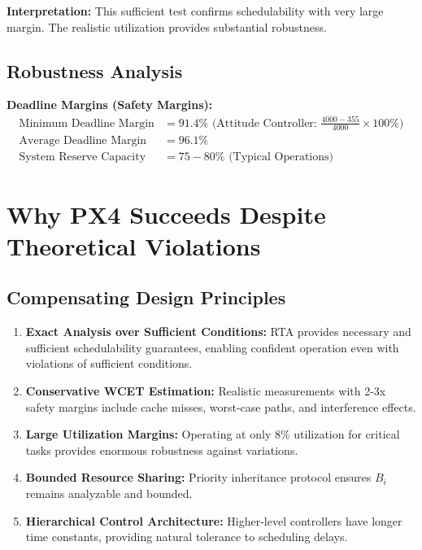 \documentclass[12pt,a4paper]{article}
\begin{document}
\textbf{Interpretation:} This sufficient test confirms schedulability with very large margin. The realistic utilization provides substantial robustness.

\subsection{Robustness Analysis}

\textbf{Deadline Margins (Safety Margins):}
\begin{align}
\text{Minimum Deadline Margin} &= 91.4\% \text{ (Attitude Controller: } \frac{4000-355}{4000} \times 100\%) \\
\text{Average Deadline Margin} &= 96.1\% \\
\text{System Reserve Capacity} &= 75-80\% \text{ (Typical Operations)}
\end{align}

\section{Why PX4 Succeeds Despite Theoretical Violations}

\subsection{Compensating Design Principles}

\begin{enumerate}
\item \textbf{Exact Analysis over Sufficient Conditions:} RTA provides necessary and sufficient schedulability guarantees, enabling confident operation even with violations of sufficient conditions.

\item \textbf{Conservative WCET Estimation:} Realistic measurements with 2-3x safety margins include cache misses, worst-case paths, and interference effects.

\item \textbf{Large Utilization Margins:} Operating at only 8\% utilization for critical tasks provides enormous robustness against variations.

\item \textbf{Bounded Resource Sharing:} Priority inheritance protocol ensures $B_i$ remains analyzable and bounded.

\item \textbf{Hierarchical Control Architecture:} Higher-level controllers have longer time constants, providing natural tolerance to scheduling delays.
\end{enumerate}
\end{document}
